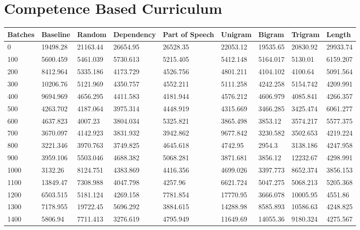 \documentclass [11pt, proquest] {uwthesis}[2020/12/20]
\begin{document}
\section{Competence Based Curriculum}
\begin{table}
\begin{tiny}
\centering
\begin{tabular}{|l|l|l|l|l|l|l|l|l|}
\hline
Batches & Baseline & Random & Dependency & Part of Speech & Unigram & Bigram & Trigram & Length \\ \hline
0 & 19498.28 & 21163.44 & 26654.95 & 26528.35 & 22053.12 & 19535.65 & 20830.92 & 29933.74 \\ \hline
100 & 5600.459 & 5461.039 & 5730.613 & 5215.405 & 5412.148 & 5164.017 & 5130.01 & 6159.207 \\ \hline
200 & 8412.964 & 5335.186 & 4173.729 & 4526.756 & 4801.211 & 4104.102 & 4100.64 & 5091.564 \\ \hline
300 & 10206.76 & 5121.969 & 4350.757 & 4552.211 & 5111.258 & 4242.258 & 5154.742 & 4209.991 \\ \hline
400 & 9694.969 & 4656.295 & 4411.583 & 4181.944 & 4576.212 & 4606.979 & 4085.841 & 4266.357 \\ \hline
500 & 4263.702 & 4187.064 & 3975.314 & 4448.919 & 4315.669 & 3466.285 & 3425.474 & 6061.277 \\ \hline
600 & 4637.823 & 4007.23 & 3804.034 & 5325.821 & 3865.498 & 3853.12 & 3574.217 & 5577.375 \\ \hline
700 & 3670.097 & 4142.923 & 3831.932 & 3942.862 & 9677.842 & 3230.582 & 3502.653 & 4219.224 \\ \hline
800 & 3221.346 & 3970.763 & 3749.825 & 4645.618 & 4742.95 & 2954.3 & 3138.186 & 4247.958 \\ \hline
900 & 3959.106 & 5503.046 & 4688.382 & 5068.281 & 3871.681 & 3856.12 & 12232.67 & 4298.991 \\ \hline
1000 & 3132.26 & 8124.751 & 4383.869 & 4416.356 & 4699.026 & 3397.773 & 8652.374 & 3856.153 \\ \hline
1100 & 13849.47 & 7308.988 & 4047.798 & 4257.96 & 6621.724 & 5047.275 & 5068.213 & 5205.368 \\ \hline
1200 & 6503.515 & 5181.124 & 4269.158 & 7781.854 & 17770.95 & 3666.078 & 10005.95 & 4551.86 \\ \hline
1300 & 7178.955 & 19722.45 & 5696.292 & 3884.615 & 14288.98 & 8585.893 & 10586.63 & 4248.825 \\ \hline
1400 & 5806.94 & 7711.413 & 3276.619 & 4795.949 & 11649.69 & 14055.36 & 9180.324 & 4275.567 \\ \hline

\end{tabular}
\end{tiny}
\end{table}
\end{document}
